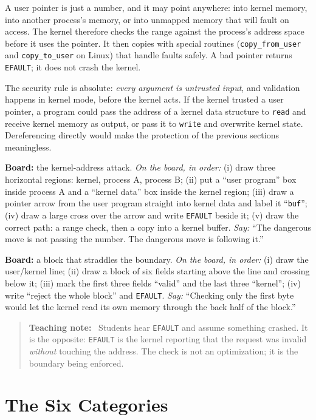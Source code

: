 \documentclass[11pt]{article}
\newenvironment{teachingaside}{\begin{quote}\small\color{primary-gold}\textbf{Teaching note:}\ }{\end{quote}}
\begin{document}
A user pointer is just a number, and it may point anywhere: into kernel memory, into another process's memory, or into unmapped memory that will fault on access. The kernel therefore checks the range against the process's address space before it uses the pointer. It then copies with special routines (\texttt{copy\_from\_user} and \texttt{copy\_to\_user} on Linux) that handle faults safely. A bad pointer returns \texttt{EFAULT}; it does not crash the kernel.

The security rule is absolute: \emph{every argument is untrusted input}, and validation happens in kernel mode, before the kernel acts. If the kernel trusted a user pointer, a program could pass the address of a kernel data structure to \texttt{read} and receive kernel memory as output, or pass it to \texttt{write} and overwrite kernel state. Dereferencing directly would make the protection of the previous sections meaningless.

\textbf{Board:} the kernel-address attack. \emph{On the board, in order:} (i) draw three horizontal regions: kernel, process A, process B; (ii) put a ``user program'' box inside process A and a ``kernel data'' box inside the kernel region; (iii) draw a pointer arrow from the user program straight into kernel data and label it ``\texttt{buf}''; (iv) draw a large cross over the arrow and write \texttt{EFAULT} beside it; (v) draw the correct path: a range check, then a copy into a kernel buffer. \emph{Say:} ``The dangerous move is not passing the number. The dangerous move is following it.''

\textbf{Board:} a block that straddles the boundary. \emph{On the board, in order:} (i) draw the user/kernel line; (ii) draw a block of six fields starting above the line and crossing below it; (iii) mark the first three fields ``valid'' and the last three ``kernel''; (iv) write ``reject the whole block'' and \texttt{EFAULT}. \emph{Say:} ``Checking only the first byte would let the kernel read its own memory through the back half of the block.''

\begin{teachingaside}
Students hear \texttt{EFAULT} and assume something crashed. It is the opposite: \texttt{EFAULT} is the kernel reporting that the request was invalid \emph{without} touching the address. The check is not an optimization; it is the boundary being enforced.
\end{teachingaside}

\section{The Six Categories}
\end{document}
